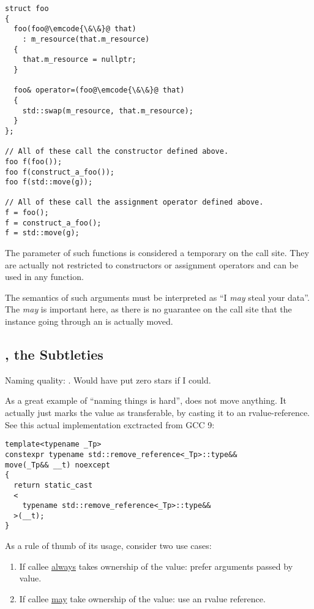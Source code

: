 \begin{lstlisting}
struct foo
{
  foo(foo@\emcode{\&\&}@ that)
    : m_resource(that.m_resource)
  {
    that.m_resource = nullptr;
  }

  foo& operator=(foo@\emcode{\&\&}@ that)
  {
    std::swap(m_resource, that.m_resource);
  }
};

// All of these call the constructor defined above.
foo f(foo());
foo f(construct_a_foo());
foo f(std::move(g));

// All of these call the assignment operator defined above.
f = foo();
f = construct_a_foo();
f = std::move(g);
\end{lstlisting}

The parameter of such functions is considered a temporary on the call
site. They are actually not restricted to constructors or assignment
operators and can be used in any function.

The semantics of such arguments must be interpreted as ``I {\em may}
steal your data''. The {\em may} is important here, as there is no
guarantee on the call site that the instance going through an
 is actually moved.

\subsection{, the Subtleties}

Naming quality: \faStar\faStarO\faStarO\faStarO\faStarO. Would have
put zero stars if I could.

As a great example of ``naming things is hard'',  does
not move anything. It actually just marks the value as transferable,
by casting it to an rvalue-reference. See this actual implementation
exctracted from GCC 9:

\begin{lstlisting}
template<typename _Tp>
constexpr typename std::remove_reference<_Tp>::type&&
move(_Tp&& __t) noexcept
{
  return static_cast
  <
    typename std::remove_reference<_Tp>::type&&
  >(__t);
}
\end{lstlisting}

\begin{guideline}
  As a rule of thumb of its usage, consider two use cases:

  \begin{enumerate}
  \item If callee \underline{always} takes ownership of the value:
    prefer arguments passed by value.
  \item If callee \underline{may} take ownership of the value: use an
    rvalue reference.
  \end{enumerate}
\end{guideline}

